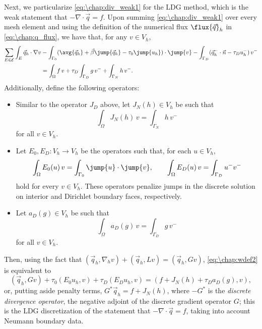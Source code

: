 Next, we particularize \cref{eq:\chap:div_weak1} for the LDG method, which is the weak statement that $-\nabla \cdot \vec{q} = f$. Upon summing \cref{eq:\chap:div_weak1} over every mesh element and using the definition of the numerical flux $\flux{\vec{q}}_h$ in \cref{eq:\chap:q_flux}, we have that, for any $v \in V_h$,
\begin{equation}\label{eq:\chap:wdef2}
\begin{aligned}
\sum_{E \in \mathcal E} \int_E \vec{q}_h \cdot \nabla v &- \int_{\Gamma_0} (\avg{\vec{q}_h} + \vec{\beta} \jump{\vec{q}_h} - \tau_0 \jump{u_h}) \cdot \jump{v} - \int_{\Gamma_D} (\vec{q}_h^- \cdot \vec{n} - \tau_D u_h^-)\,v^- \\
&= \int_\Omega f\,v + \tau_D \int_{\Gamma_D} g\,v^- + \int_{\Gamma_N} h\,v^-.
\end{aligned}
\end{equation}
Additionally, define the following operators:
\begin{itemize}[itemsep=0.5em]
\item Similar to the operator $J_D$ above, let $J_N(h) \in V_h$ be such that
\[
\int_\Omega J_N(h)\,v = \int_{\Gamma_N} h\,v^-
\]
for all $v \in V_h$.
\item Let $E_0, E_D : V_h \to V_h$ be the operators such that, for each $u \in V_h$,
\[
\int_\Omega E_0 (u)\, v = \int_{\Gamma_0} \jump{u} \cdot \jump{v}, \qquad \int_\Omega E_D (u)\,v = \int_{\Gamma_D} u^- v^-
\]
hold for every $v \in V_h$. These operators penalize jumps in the discrete solution on interior and Dirichlet boundary faces, respectively.
\item Let $a_D(g) \in V_h$ be such that
\[
\int_{\Omega} a_D(g)\, v = \int_{\Gamma_D} g\,v^-
\]
for all $v \in V_h$.
\end{itemize}
Then, using the fact that $(\vec{q}_h, \nabla_h v) + (\vec{q}_h, Lv) = (\vec{q}_h, Gv)$, \cref{eq:\chap:wdef2} is equivalent to 
\begin{equation}\label{eq:\chap:wresult}
(\vec{q}_h, Gv) + \tau_0 (E_0 u_h, v) + \tau_D (E_D u_h, v) = (f + J_N(h) + \tau_D a_D(g), v),
\end{equation}
or, putting aside penalty terms, $G^\ast \vec{q}_h = f + J_N(h)$, where $-G^\ast$ is the \emph{discrete divergence operator}, the negative adjoint of the discrete gradient operator $G$; this is the LDG discretization of the statement that $-\nabla \cdot \vec{q} = f$, taking into account Neumann boundary data.

